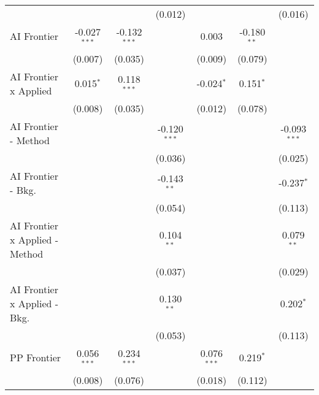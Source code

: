 \begin{tabular}{lcccccc}
                                  &                &                & (0.012)        &                &                & (0.016)\\   
   AI Frontier                    & -0.027$^{***}$ & -0.132$^{***}$ &                & 0.003          & -0.180$^{**}$  &   \\   
                                  & (0.007)        & (0.035)        &                & (0.009)        & (0.079)        &   \\   
   AI Frontier x Applied          & 0.015$^{*}$    & 0.118$^{***}$  &                & -0.024$^{*}$   & 0.151$^{*}$    &   \\   
                                  & (0.008)        & (0.035)        &                & (0.012)        & (0.078)        &   \\   
   AI Frontier - Method           &                &                & -0.120$^{***}$ &                &                & -0.093$^{***}$\\   
                                  &                &                & (0.036)        &                &                & (0.025)\\   
   AI Frontier - Bkg.             &                &                & -0.143$^{**}$  &                &                & -0.237$^{*}$\\   
                                  &                &                & (0.054)        &                &                & (0.113)\\   
   AI Frontier x Applied - Method &                &                & 0.104$^{**}$   &                &                & 0.079$^{**}$\\   
                                  &                &                & (0.037)        &                &                & (0.029)\\   
   AI Frontier x Applied - Bkg.   &                &                & 0.130$^{**}$   &                &                & 0.202$^{*}$\\   
                                  &                &                & (0.053)        &                &                & (0.113)\\   
   PP Frontier                    & 0.056$^{***}$  & 0.234$^{***}$  &                & 0.076$^{***}$  & 0.219$^{*}$    &   \\   
                                  & (0.008)        & (0.076)        &                & (0.018)        & (0.112)        &   \\   

\end{tabular}

